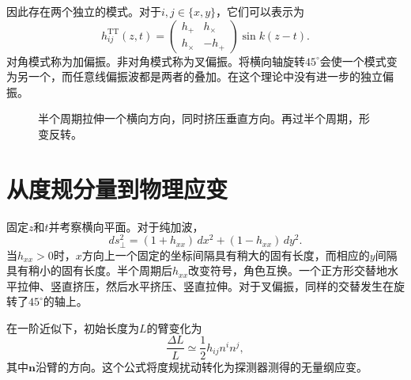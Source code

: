 因此存在两个独立的模式。对于\(i,j\in\{x,y\}\)，它们可以表示为
\begin{equation}
 h^{\mathrm{TT}}_{ij}(z,t)
 =
 \begin{pmatrix}
 h_+ & h_\times\\
 h_\times & -h_+
 \end{pmatrix}
 \sin k(z-t).
 \label{eq:polarization-matrix}
\end{equation}
对角模式称为加偏振。非对角模式称为叉偏振。将横向轴旋转\(45^\circ\)会使一个模式变为另一个，而任意线偏振波都是两者的叠加。在这个理论中没有进一步的独立偏振。

\begin{figure}[htbp]
\centering
{}
\caption{半个周期拉伸一个横向方向，同时挤压垂直方向。再过半个周期，形变反转。}
\end{figure}

\section{从度规分量到物理应变}

固定\(z\)和\(t\)并考察横向平面。对于纯加波，
\begin{equation}
 ds_\perp^2
 =(1+h_{xx})\,dx^2+(1-h_{xx})\,dy^2.
 \label{eq:transverse-distance}
\end{equation}
当\(h_{xx}>0\)时，\(x\)方向上一个固定的坐标间隔具有稍大的固有长度，而相应的\(y\)间隔具有稍小的固有长度。半个周期后\(h_{xx}\)改变符号，角色互换。一个正方形交替地水平拉伸、竖直挤压，然后水平挤压、竖直拉伸。对于叉偏振，同样的交替发生在旋转了\(45^\circ\)的轴上。

在一阶近似下，初始长度为\(L\)的臂变化为
\begin{equation}
 \frac{\Delta L}{L}\simeq\frac12 h_{ij}n^i n^j,
 \label{eq:fractional-strain}
\end{equation}
其中\(\mathbf n\)沿臂的方向。这个公式将度规扰动转化为探测器测得的无量纲应变。

